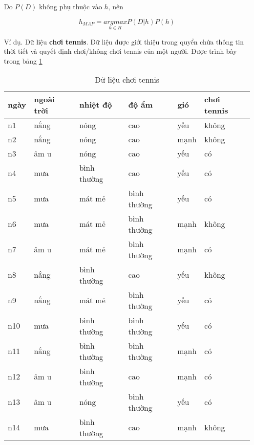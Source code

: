 Do $P(D)$ không phụ thuộc vào $h$, nên

\begin{equation}
\label{equation:map-3}
h_{MAP} = \underset{h \in H}{argmax} P(D|h)P(h)
\end{equation}

Ví dụ. Dữ liệu \textbf{chơi tennis}. Dữ liệu được giới thiệu trong quyển \cite{Mitchell:1997:ML:541177} chứa thông tin thời tiết và quyết định chơi/không chơi tennis của một người. Được trình bày trong bảng \ref{table:dataset-play-tennis}

\begin{table}[]
\centering
\label{table:dataset-play-tennis}
\begin{tabular}{|l|l|l|l|l|l|}
\hline
\bfseries ngày & \bfseries ngoài trời & \bfseries nhiệt độ     & \bfseries độ ẩm       & \bfseries gió  & \bfseries chơi tennis \\ \hline
n1   & nắng       & nóng        & cao         & yếu  & không       \\ \hline
n2   & nắng       & nóng        & cao         & mạnh & không       \\ \hline
n3   & âm u       & nóng        & cao         & yếu  & có          \\ \hline
n4   & mưa        & bình thường & cao         & yếu  & có          \\ \hline
n5   & mưa        & mát mẻ      & bình thường & yếu  & có          \\ \hline
n6   & mưa        & mát mẻ      & bình thường & mạnh & không       \\ \hline
n7   & âm u       & mát mẻ      & bình thường & mạnh & có          \\ \hline
n8   & nắng       & bình thường & cao         & yếu  & không       \\ \hline
n9   & nắng       & mát mẻ      & bình thường & yếu  & có          \\ \hline
n10  & mưa        & bình thường & bình thường & yếu  & có          \\ \hline
n11  & nắng       & bình thường & bình thường & mạnh & có          \\ \hline
n12  & âm u       & bình thường & cao         & mạnh & có          \\ \hline
n13  & âm u       & nóng        & bình thường & yếu  & có          \\ \hline
n14  & mưa        & bình thường & cao         & mạnh & không       \\ \hline
\end{tabular}
\caption{Dữ liệu chơi tennis}
\end{table}

